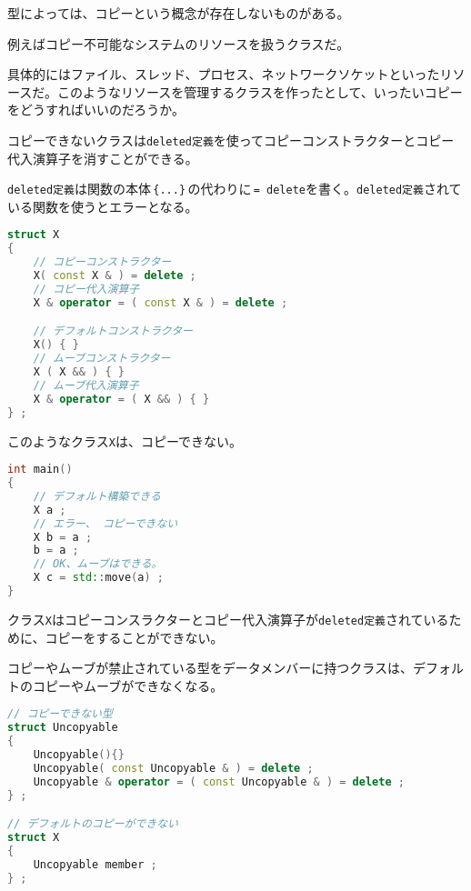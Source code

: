 
型によっては、コピーという概念が存在しないものがある。

例えばコピー不可能なシステムのリソースを扱うクラスだ。

具体的にはファイル、スレッド、プロセス、ネットワークソケットといったリソースだ。このようなリソースを管理するクラスを作ったとして、いったいコピーをどうすればいいのだろうか。

コピーできないクラスは\texttt{deleted定義}を使ってコピーコンストラクターとコピー代入演算子を消すことができる。

\texttt{deleted定義}は関数の本体\,\texttt{\{...\}}\,の代わりに\,\texttt{= delete}を書く。\texttt{deleted定義}されている関数を使うとエラーとなる。

\begin{lstlisting}[language={C++}]
struct X
{
    // コピーコンストラクター
    X( const X & ) = delete ;
    // コピー代入演算子
    X & operator = ( const X & ) = delete ;

    // デフォルトコンストラクター
    X() { }
    // ムーブコンストラクター
    X ( X && ) { }
    // ムーブ代入演算子
    X & operator = ( X && ) { }
} ;
\end{lstlisting}

このようなクラス\texttt{X}は、コピーできない。

\begin{lstlisting}[language={C++}]
int main()
{
    // デフォルト構築できる
    X a ;
    // エラー、 コピーできない
    X b = a ;
    b = a ;
    // OK、ムーブはできる。
    X c = std::move(a) ;
}
\end{lstlisting}

クラス\texttt{X}はコピーコンスラクターとコピー代入演算子が\texttt{deleted定義}されているために、コピーをすることができない。

コピーやムーブが禁止されている型をデータメンバーに持つクラスは、デフォルトのコピーやムーブができなくなる。

\begin{lstlisting}[language={C++}]
// コピーできない型
struct Uncopyable
{
    Uncopyable(){}
    Uncopyable( const Uncopyable & ) = delete ;
    Uncopyable & operator = ( const Uncopyable & ) = delete ; 
} ;

// デフォルトのコピーができない
struct X
{
    Uncopyable member ;
} ;
\end{lstlisting}

